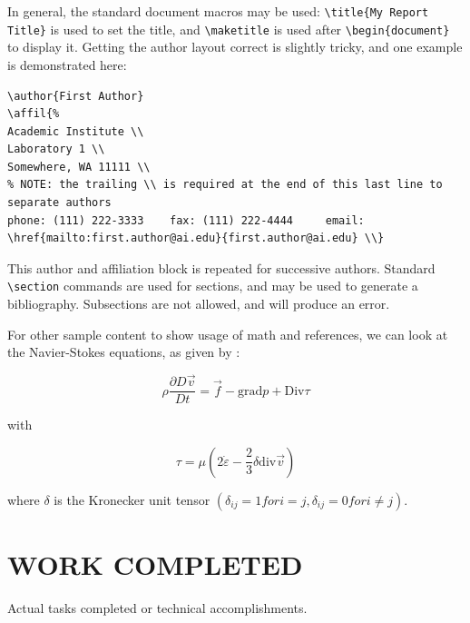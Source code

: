 \documentclass{onrannual}
\begin{document}
In general, the standard document macros may be used: \verb=\title{My Report Title}= is used to
set the title, and \verb=\maketitle= is used after \verb=\begin{document}= to display it.
Getting the author layout correct is slightly tricky, and one example is demonstrated here:
{
\scriptsize
\begin{verbatim}
\author{First Author}
\affil{%
Academic Institute \\
Laboratory 1 \\
Somewhere, WA 11111 \\
% NOTE: the trailing \\ is required at the end of this last line to separate authors
phone: (111) 222-3333    fax: (111) 222-4444     email: \href{mailto:first.author@ai.edu}{first.author@ai.edu} \\}
\end{verbatim}
}

This author and affiliation block is repeated for successive authors.
Standard \verb=\section= commands are used for sections, and \verb== may be
used to generate a bibliography. Subsections are not allowed, and will produce an error.

For other sample content to show usage of math and references, we can look at the 
Navier-Stokes equations, as given by \citet{Schlichting:2000}:

\begin{equation}
    \rho \frac{\partial D\overrightarrow{v}}{Dt} = \overrightarrow{f} - \mathrm{grad} p + \mathrm{Div} \tau
\end{equation}

with

\begin{equation}
    \tau = \mu \left(2\dot{\varepsilon} - \frac{2}{3}\delta \mathrm{div}\overrightarrow{v}\right)
\end{equation}

where $\delta$ is the Kronecker unit tensor $\left(\delta_{ij} = 1 for i = j, \delta_{ij} = 0 for i \neq j\right)$.

\section{WORK COMPLETED}
Actual tasks completed or technical accomplishments.
\end{document}
